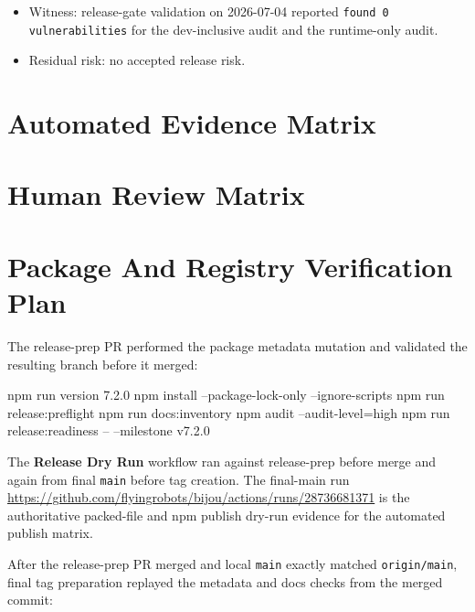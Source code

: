 \begin{itemize}
\item
  Witness: release-gate validation on 2026-07-04 reported \texttt{f\allowbreak{}o\allowbreak{}u\allowbreak{}n\allowbreak{}d\allowbreak{} \allowbreak{}0\allowbreak{} \allowbreak{}v\allowbreak{}u\allowbreak{}l\allowbreak{}n\allowbreak{}e\allowbreak{}r\allowbreak{}a\allowbreak{}b\allowbreak{}i\allowbreak{}l\allowbreak{}i\allowbreak{}t\allowbreak{}i\allowbreak{}e\allowbreak{}s} for the dev-inclusive audit and the runtime-only audit.
\item
  Residual risk: no accepted release risk.
\end{itemize}

\section{Automated Evidence Matrix}\label{record-261-automated-evidence-matrix}



\section{Human Review Matrix}\label{record-261-human-review-matrix}



\section{Package And Registry Verification Plan}\label{record-261-package-and-registry-verification-plan}

The release-prep PR performed the package metadata mutation and validated the resulting branch before it merged:

\begin{CodeBlock}
npm run version 7.2.0
npm install --package-lock-only --ignore-scripts
npm run release:preflight
npm run docs:inventory
npm audit --audit-level=high
npm run release:readiness -- --milestone v7.2.0
\end{CodeBlock}

The \textbf{Release Dry Run} workflow ran against release-prep before merge and again from final \texttt{m\allowbreak{}a\allowbreak{}i\allowbreak{}n} before tag creation. The final-main run \url{https://github.com/flyingrobots/bijou/actions/runs/28736681371} is the authoritative packed-file and npm publish dry-run evidence for the automated publish matrix.

After the release-prep PR merged and local \texttt{m\allowbreak{}a\allowbreak{}i\allowbreak{}n} exactly matched \texttt{o\allowbreak{}r\allowbreak{}i\allowbreak{}g\allowbreak{}i\allowbreak{}n\allowbreak{}/\allowbreak{}m\allowbreak{}a\allowbreak{}i\allowbreak{}n}, final tag preparation replayed the metadata and docs checks from the merged commit:

